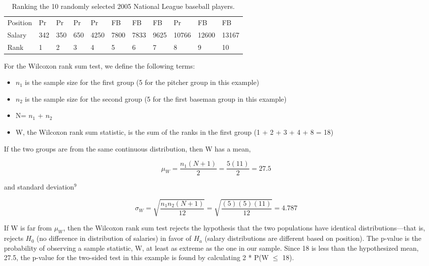 \documentclass[
]{report}
\providecommand{\tightlist}{%
  \setlength{\itemsep}{0pt}\setlength{\parskip}{0pt}}
\begin{document}
\begin{table}

\caption{\label{tab:table3}Ranking the 10 randomly selected 2005 National League baseball players.}
\centering
\begin{tabular}[t]{lllllllllll}
\toprule
Position & Pr & Pr & Pr & Pr & FB & FB & FB & Pr & FB & FB\\
Salary & 342 & 350 & 650 & 4250 & 7800 & 7833 & 9625 & 10766 & 12600 & 13167\\
Rank & 1 & 2 & 3 & 4 & 5 & 6 & 7 & 8 & 9 & 10\\
\bottomrule
\end{tabular}
\end{table}

For the Wilcoxon rank sum test, we define the following terms:

\begin{itemize}
\tightlist
\item
  \(n_1\) is the sample size for the first group (5 for the pitcher group in this example)
\item
  \(n_2\) is the sample size for the second group (5 for the first baseman group in this example)
\item
  N= \(n_1\) + \(n_2\)
\item
  W, the Wilcoxon rank sum statistic, is the sum of the ranks in the first group
  (1 + 2 + 3 + 4 + 8 = 18)
\end{itemize}

If the two groups are from the same continuous distribution, then W has a mean,

\begin{equation} 
  \mu_W = \frac{n_1(N+1)}{2} = \frac{5(11)}{2}=27.5
  \tag{1.3} \label{eq:1_3}
\end{equation}

and standard deviation\(^9\)

\begin{equation} 
  \sigma_W = \sqrt{\frac{n_1n_2(N+1)}{12}} = \sqrt{\frac{(5)(5)(11)}{12}}= 4.787
  \tag{1.4} \label{eq:1_4}
\end{equation}

If W is far from \(\mu_W\), then the Wilcoxon rank sum test rejects the hypothesis that the two populations have identical distributions---that is, rejects \(H_0\) (no difference in distribution of salaries) in favor of \(H_a\) (salary distributions are different based on position). The p-value is the probability of observing a sample statistic, W, at least as extreme as the one in our sample. Since 18 is less than the hypothesized mean, 27.5, the p-value for the two-sided test in this example is found by calculating 2 * P(W \(\leq\) 18).
\end{document}

